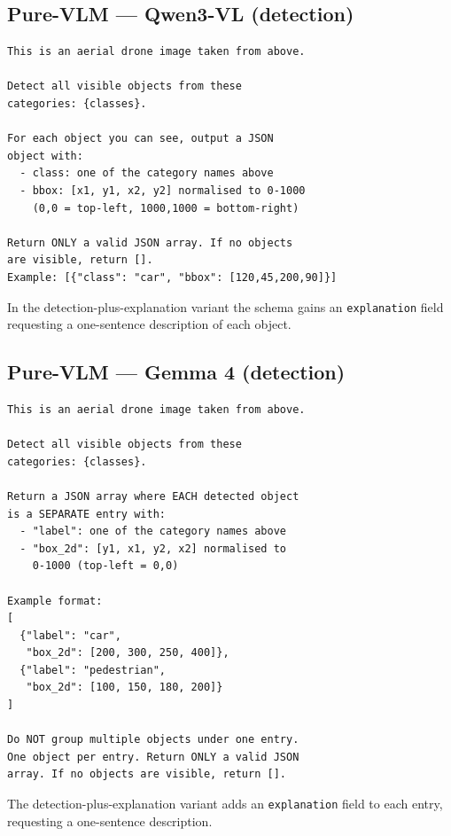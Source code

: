\documentclass[acmtog, authorversion]{acmart}
\begin{document}
\subsection{Pure-VLM --- Qwen3-VL (detection)}
\begin{verbatim}
This is an aerial drone image taken from above.

Detect all visible objects from these
categories: {classes}.

For each object you can see, output a JSON
object with:
  - class: one of the category names above
  - bbox: [x1, y1, x2, y2] normalised to 0-1000
    (0,0 = top-left, 1000,1000 = bottom-right)

Return ONLY a valid JSON array. If no objects
are visible, return [].
Example: [{"class": "car", "bbox": [120,45,200,90]}]
\end{verbatim}
In the detection-plus-explanation variant the schema gains an
\texttt{explanation} field requesting a one-sentence description of
each object.

\subsection{Pure-VLM --- Gemma 4 (detection)}
\begin{verbatim}
This is an aerial drone image taken from above.

Detect all visible objects from these
categories: {classes}.

Return a JSON array where EACH detected object
is a SEPARATE entry with:
  - "label": one of the category names above
  - "box_2d": [y1, x1, y2, x2] normalised to
    0-1000 (top-left = 0,0)

Example format:
[
  {"label": "car",
   "box_2d": [200, 300, 250, 400]},
  {"label": "pedestrian",
   "box_2d": [100, 150, 180, 200]}
]

Do NOT group multiple objects under one entry.
One object per entry. Return ONLY a valid JSON
array. If no objects are visible, return [].
\end{verbatim}
The detection-plus-explanation variant adds an \texttt{explanation}
field to each entry, requesting a one-sentence description.
\end{document}
